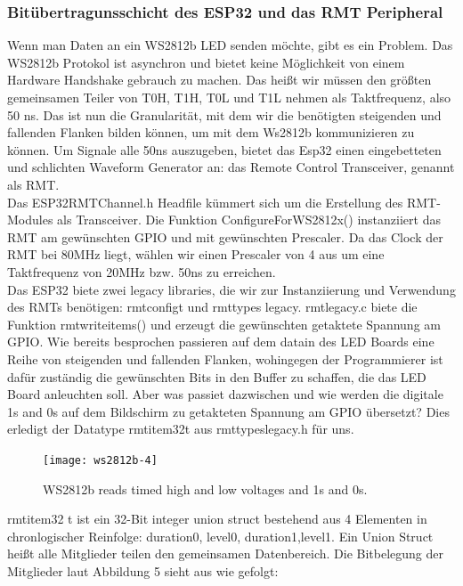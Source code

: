 \documentclass[12pt,a4paper]{article}
\begin{document}
\subsubsection{Bitübertragunsschicht des ESP32 und das RMT Peripheral}
Wenn man Daten an ein WS2812b LED senden möchte, gibt es ein Problem. Das WS2812b Protokol ist asynchron und bietet keine Möglichkeit von einem Hardware Handshake gebrauch zu machen. Das heißt wir müssen den größten gemeinsamen Teiler von T0H, T1H, T0L und T1L nehmen als Taktfrequenz, also 50 ns. Das ist nun die Granularität, mit dem wir die benötigten steigenden und fallenden Flanken bilden können, um mit dem Ws2812b kommunizieren zu können.
Um Signale alle 50ns auszugeben, bietet das Esp32 einen eingebetteten und schlichten Waveform Generator an: das Remote Control Transceiver, genannt als RMT. 
\vspace{1ex}\\
Das ESP32RMTChannel.h Headfile kümmert sich um die Erstellung des RMT-Modules als Transceiver. Die Funktion ConfigureForWS2812x() instanziiert das RMT am gewünschten GPIO und mit gewünschten Prescaler. Da das Clock der RMT bei 80MHz liegt, wählen wir einen Prescaler von 4 aus um eine Taktfrequenz von 20MHz bzw. 50ns zu erreichen. 
\vspace{1ex}\\
Das ESP32 biete zwei legacy libraries, die wir zur Instanziierung und Verwendung des RMTs benötigen: rmt\textunderscore config\textunderscore t und rmt\textunderscore types \textunderscore legacy. rmt\textunderscore legacy.c biete die Funktion rmt\textunderscore write\textunderscore items() und erzeugt die gewünschten getaktete Spannung am GPIO. Wie bereits besprochen passieren auf dem data\textunderscore in des LED Boards eine Reihe von steigenden und fallenden Flanken, wohingegen der Programmierer ist dafür zuständig die gewünschten Bits in den Buffer zu schaffen, die das LED Board anleuchten soll. Aber was passiet dazwischen und wie werden die digitale 1s and 0s auf dem Bildschirm zu getakteten Spannung am GPIO übersetzt? Dies erledigt der Datatype rmt\textunderscore item32\textunderscore t aus rmt\textunderscore types\textunderscore legacy.h für uns. \cite{esptime32:Dok}

	\begin{figure}[h]
	\centering
	\texttt{[image: ws2812b-4]}
	\caption{\label{fig:timing}WS2812b reads timed high and low voltages and 1s and 	0s.}
	\end{figure}
	
rmt\textunderscore item32 \textunderscore t ist ein 32-Bit integer union struct bestehend aus 4 Elementen in chronlogischer Reinfolge: duration0, level0, duration1,level1. Ein Union Struct heißt alle Mitglieder teilen den gemeinsamen Datenbereich. Die Bitbelegung der Mitglieder laut Abbildung 5 sieht aus wie gefolgt:
\end{document}
